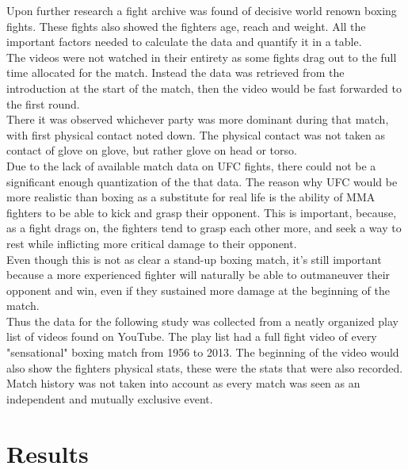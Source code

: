 \documentclass{article}
\begin{document}
Upon further research a fight archive was found of decisive world renown boxing fights. These fights also showed the fighters age, reach and weight.\cite{five} All the important factors needed to calculate the data and quantify it in a table.\\
The videos were not watched in their entirety as some fights drag out to the full time allocated for the match. Instead the data was retrieved from the introduction at the start of the match, then the video would be fast forwarded to the first round.\cite{five} \\
There it was observed whichever party was more dominant during that match, with first physical contact noted down. The physical contact was not taken as contact of glove on glove, but rather glove on head or torso.\\



Due to the lack of available match data on UFC fights, there could not be a significant enough quantization of the that  data. The reason why UFC would be more realistic than boxing as a substitute for real life is the ability of MMA fighters to be able to kick and grasp their opponent. This is important, because, as a fight drags on, the fighters tend to grasp each other more, and seek a way to rest while inflicting more critical damage to their opponent.\\
Even though this is not as clear a stand-up boxing match, it's still important because a more experienced fighter will naturally be able to outmaneuver their opponent and win, even if they sustained more damage at the beginning of the match.\\
Thus the data for the following study was collected from a neatly organized play list of videos found on YouTube. The play list had a full fight video of every "sensational" boxing match from 1956 to 2013. The beginning of the video would also show the fighters physical stats, these were the stats that were also recorded.\\
Match history was not taken into account as every match was seen as an independent and mutually exclusive event.

 

\pagebreak
\section{Results}\label{sec:result}
\end{document}
